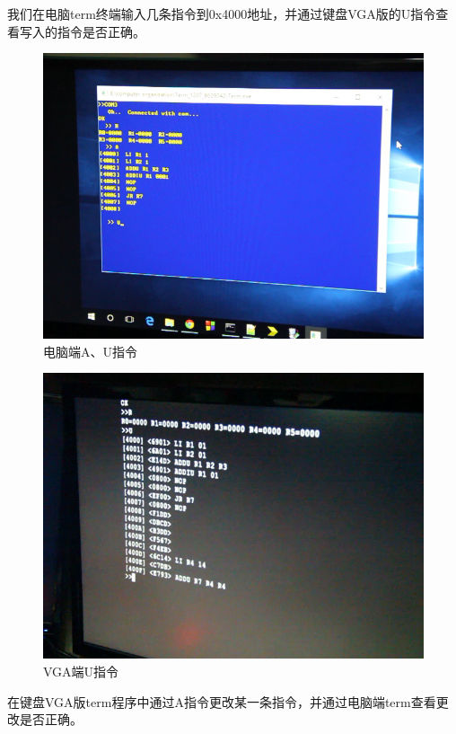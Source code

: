 我们在电脑term终端输入几条指令到0x4000地址，并通过键盘VGA版的U指令查看写入的指令是否正确。

\begin{figure}[H]
  \includegraphics[width=\linewidth]{Figures/picture/vlcsnap-2015-12-10-00h17m47s086.png}
  \caption{电脑端A、U指令}
\end{figure}

\begin{figure}[H]
  \includegraphics[width=\linewidth]{Figures/picture/vlcsnap-2015-12-10-00h18m07s281.png}
  \caption{VGA端U指令}
\end{figure}

在键盘VGA版term程序中通过A指令更改某一条指令，并通过电脑端term查看更改是否正确。

